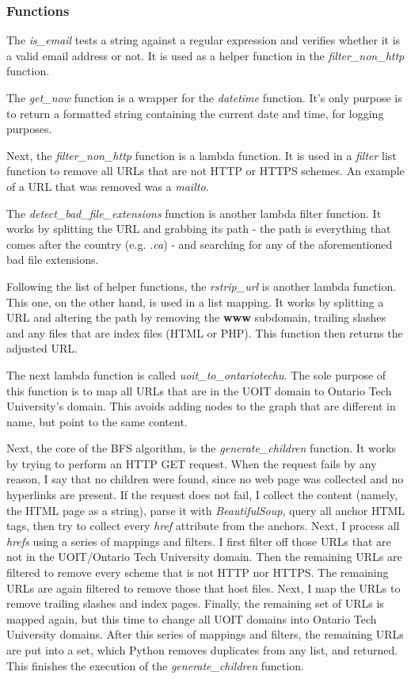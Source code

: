 \subsubsection{Functions}
The \textit{is\_email} tests a string against a regular expression and verifies whether it is a valid email address or not. It is used as a helper function in the \textit{filter\_non\_http} function.

The \textit{get\_now} function is a wrapper for the \textit{datetime} function. It's only purpose is to return a formatted string containing the current date and time, for logging purposes.

Next, the \textit{filter\_non\_http} function is a lambda function. It is used in a \textit{filter} list function to remove all URLs that are not HTTP or HTTPS schemes. An example of a URL that was removed was a \textit{mailto}.

The \textit{detect\_bad\_file\_extensions} function is another lambda filter function. It works by splitting the URL and grabbing its path - the path is everything that comes after the country (e.g. \textit{.ca}) - and searching for any of the aforementioned bad file extensions.

Following the list of helper functions, the \textit{rstrip\_url} is another lambda function. This one, on the other hand, is used in a list mapping. It works by splitting a URL and altering the path by removing the \textbf{www} subdomain, trailing slashes and any files that are index files (HTML or PHP). This function then returns the adjusted URL.

The next lambda function is called \textit{uoit\_to\_ontariotechu}. The sole purpose of this function is to map all URLs that are in the UOIT domain to Ontario Tech University's domain. This avoids adding nodes to the graph that are different in name, but point to the same content.

Next, the core of the BFS algorithm, is the \textit{generate\_children} function. It works by trying to perform an HTTP GET request. When the request fails by any reason, I say that no children were found, since no web page was collected and no hyperlinks are present. If the request does not fail, I collect the content (namely, the HTML page as a string), parse it with \textit{BeautifulSoup}, query all anchor HTML tags, then try to collect every \textit{href} attribute from the anchors. Next, I process all \textit{hrefs} using a series of mappings and filters. I first filter off those URLs that are not in the UOIT/Ontario Tech University domain. Then the remaining URLs are filtered to remove every scheme that is not HTTP nor HTTPS. The remaining URLs are again filtered to remove those that host files. Next, I map the URLs to remove trailing slashes and index pages. Finally, the remaining set of URLs is mapped again, but this time to change all UOIT domains into Ontario Tech University domains. After this series of mappings and filters, the remaining URLs are put into a set, which Python removes duplicates from any list, and returned. This finishes the execution of the \textit{generate\_children} function.

